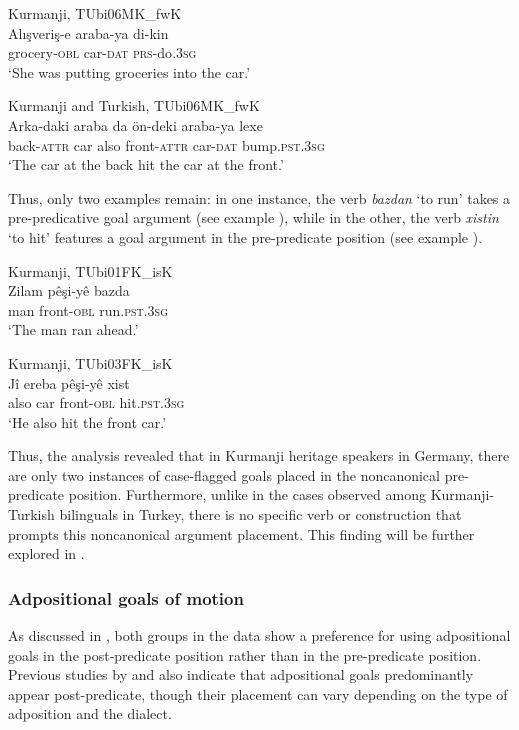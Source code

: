 \ea \label{ex:key:64} Kurmanji, TUbi06MK\_fwK \\
\gll Alışveriş-e   araba-ya   di-kin  \\
grocery-\textsc{obl}  car-\textsc{dat}  \textsc{prs}-do\textsc{.3sg}\\
\glt ‘She was putting groceries into the car.’ 
\z

\ea
  \label{ex:key:65} Kurmanji and Turkish, TUbi06MK\_fwK \\
     \gll Arka-daki   araba   da   ön-deki   araba-ya   lexe \\
back\textsc{-attr}  car  also  front-\textsc{attr}  car-\textsc{dat}  bump\textsc{.pst.3sg}\\
\glt ‘The car at the back hit the car at the front.’ 
  \z

Thus, only two examples remain: in one instance, the verb \textit{bazdan} ‘to run’ takes a pre-predicative goal argument (see example ), while in the other, the verb \textit{xistin} ‘to hit’ features a goal argument in the pre-predicate position (see example ).

\ea
  \label{ex:key:66} Kurmanji, TUbi01FK\_isK \\
     \gll Zilam   pêşi-yê   bazda\\
man  front-\textsc{obl}  run\textsc{.pst.3sg}    \\
\glt ‘The man ran ahead.’ 
  \z

\ea
  \label{ex:key:67} Kurmanji, TUbi03FK\_isK \\
\gll Jî  ereba  pêşi-yê    xist\\
also  car  front-\textsc{obl}  hit.\textsc{pst.3sg}\\
\glt ‘He also hit the front car.’ 
  \z

Thus, the analysis revealed that in Kurmanji heritage speakers in Germany, there are only two instances of case-flagged goals placed in the noncanonical pre-predicate position. Furthermore, unlike in the cases observed among Kurmanji-Turkish bilinguals in Turkey, there is no specific verb or construction that prompts this noncanonical argument placement. This finding will be further explored in .

\subsubsection{Adpositional goals of motion}

As discussed in , both groups in the data show a preference for using adpositional goals in the post-predicate position rather than in the pre-predicate position. Previous studies by \citet{Haig2014} and \citet{Gundogdu2019} also indicate that adpositional goals predominantly appear post-predicate, though their placement can vary depending on the type of adposition and the dialect.

